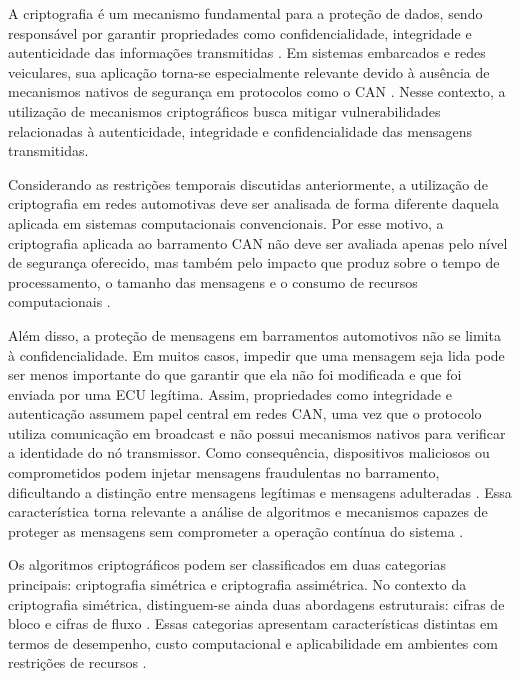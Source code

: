 A criptografia é um mecanismo fundamental para a proteção de dados, sendo responsável por garantir propriedades como confidencialidade, integridade e autenticidade das informações transmitidas \cite{menezes2018handbook}. Em sistemas embarcados e redes veiculares, sua aplicação torna-se especialmente relevante devido à ausência de mecanismos nativos de segurança em protocolos como o CAN \cite{ribeiro2024decodificando}. Nesse contexto, a utilização de mecanismos criptográficos busca mitigar vulnerabilidades relacionadas à autenticidade, integridade e confidencialidade das mensagens transmitidas.

Considerando as restrições temporais discutidas anteriormente, a utilização de criptografia em redes automotivas deve ser analisada de forma diferente daquela aplicada em sistemas computacionais convencionais. Por esse motivo, a criptografia aplicada ao barramento CAN não deve ser avaliada apenas pelo nível de segurança oferecido, mas também pelo impacto que produz sobre o tempo de processamento, o tamanho das mensagens e o consumo de recursos computacionais \cite{diao2011resource}.

Além disso, a proteção de mensagens em barramentos automotivos não se limita à confidencialidade. Em muitos casos, impedir que uma mensagem seja lida pode ser menos importante do que garantir que ela não foi modificada e que foi enviada por uma ECU legítima. Assim, propriedades como integridade e autenticação assumem papel central em redes CAN, uma vez que o protocolo utiliza comunicação em broadcast e não possui mecanismos nativos para verificar a identidade do nó transmissor. Como consequência, dispositivos maliciosos ou comprometidos podem injetar mensagens fraudulentas no barramento, dificultando a distinção entre mensagens legítimas e mensagens adulteradas \cite{lotto2024survey}. Essa característica torna relevante a análise de algoritmos e mecanismos capazes de proteger as mensagens sem comprometer a operação contínua do sistema \cite{basavaraj2022towards}.

Os algoritmos criptográficos podem ser classificados em duas categorias principais: criptografia simétrica e criptografia assimétrica. No contexto da criptografia simétrica, distinguem-se ainda duas abordagens estruturais: cifras de bloco e cifras de fluxo \cite{forouzan2007cryptography}. Essas categorias apresentam características distintas em termos de desempenho, custo computacional e aplicabilidade em ambientes com restrições de recursos \cite{dudhat2024comparative}.


